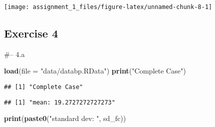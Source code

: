 \documentclass[
]{article}
\newenvironment{Shaded}{\begin{snugshade}}{\end{snugshade}}
\newcommand{\DataTypeTok}[1]{\textcolor[rgb]{0.13,0.29,0.53}{#1}}
\newcommand{\KeywordTok}[1]{\textcolor[rgb]{0.13,0.29,0.53}{\textbf{#1}}}
\newcommand{\NormalTok}[1]{#1}
\newcommand{\OperatorTok}[1]{\textcolor[rgb]{0.81,0.36,0.00}{\textbf{#1}}}
\newcommand{\OtherTok}[1]{\textcolor[rgb]{0.56,0.35,0.01}{#1}}
\newcommand{\StringTok}[1]{\textcolor[rgb]{0.31,0.60,0.02}{#1}}
\begin{document}
\begin{center}\texttt{[image: assignment\_1\_files/figure-latex/unnamed-chunk-8-1]} \end{center}

\hypertarget{exercise-4}{%
\subsection{Exercise 4}\label{exercise-4}}

\#-- 4.a

\begin{Shaded}
\begin{Highlighting}[]
\KeywordTok{load}\NormalTok{(}\DataTypeTok{file =} \StringTok{"data/databp.RData"}\NormalTok{)}
\KeywordTok{print}\NormalTok{(}\StringTok{"Complete Case"}\NormalTok{)}
\end{Highlighting}
\end{Shaded}

\begin{verbatim}
## [1] "Complete Case"
\end{verbatim}

\begin{Shaded}
\end{Shaded}

\begin{verbatim}
## [1] "mean: 19.2727272727273"
\end{verbatim}

\begin{Shaded}
\begin{Highlighting}[]
\KeywordTok{print}\NormalTok{(}\KeywordTok{paste0}\NormalTok{(}\StringTok{"standard dev: "}\NormalTok{, sd_fc))}
\end{Highlighting}
\end{Shaded}
\end{document}
